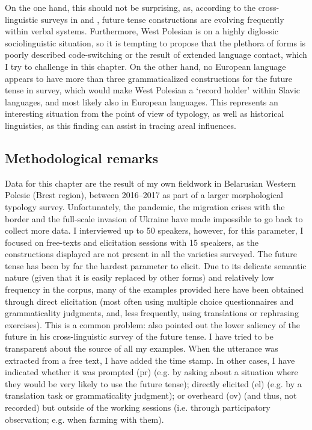 \documentclass[output=paper,colorlinks,citecolor=brown]{langscibook}
\begin{document}
On the one hand, this should not be surprising, as, according to the cross-linguistic surveys in \citet{Bybee1985} and \citet{Ultan1978}, future tense constructions are evolving frequently within verbal systems. Furthermore, West Polesian is on a highly diglossic sociolinguistic situation, so it is tempting to propose that the plethora of forms is poorly described code-switching or the result of extended language contact, which I try to challenge in this chapter. On the other hand, no European language appears to have more than three grammaticalized constructions for the future tense in  survey, which would make West Polesian a ‘record holder’ within Slavic languages, and most likely also in European languages. This represents an interesting situation from the point of view of typology, as well as historical linguistics, as this finding can assist in tracing areal influences.

\subsection{Methodological remarks} \label{sec:roncero:1.3}

Data for this chapter are the result of my own fieldwork in Belarusian Western Polesie (Brest region), between 2016--2017 as part of a larger morphological typology survey. Unfortunately, the pandemic, the migration crises with the border and the full-scale invasion of Ukraine have made impossible to go back to collect more data. I interviewed up to 50 speakers, however, for this parameter, I focused on free-texts and elicitation sessions with 15 speakers, as the constructions displayed are not present in all the varieties surveyed. The future tense has been by far the hardest parameter to elicit. Due to its delicate semantic nature (given that it is easily replaced by other forms) and relatively low frequency in the corpus, many of the examples provided here have been obtained through direct elicitation (most often using multiple choice questionnaires and grammaticality judgments, and, less frequently, using translations or rephrasing exercises). This is a common problem: \citet[89]{Ultan1978} also pointed out the lower saliency of the future in his cross-linguistic survey of the future tense. I have tried to be transparent about the source of all my examples. When the utterance was extracted from a free text, I have added the time stamp. In other cases, I have indicated whether it was prompted (pr) (e.g. by asking about a situation where they would be very likely to use the future tense); directly elicited (el) (e.g. by a translation task or grammaticality judgment); or overheard (ov) (and thus, not recorded) but outside of the working sessions (i.e. through participatory observation; e.g. when farming with them). 
\end{document}
